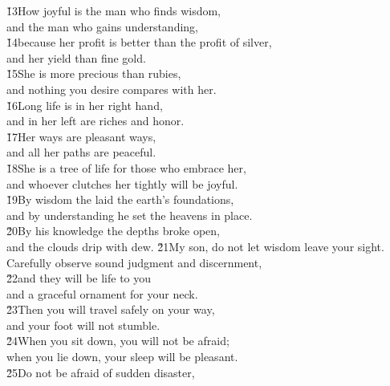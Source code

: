 \begin{poetry}
\poeml \v{13}How joyful is the man who finds wisdom, \\
\poemll    and the man who gains understanding, \\
\poeml \v{14}because her profit is better than the profit of silver, \\
\poemll    and her yield than fine gold. \\
\poeml \v{15}She is more precious than rubies, \\
\poemll    and nothing you desire compares with her. \\
\poeml \v{16}Long life is in her right hand, \\
\poemll    and in her left are riches and honor. \\
\poeml \v{17}Her ways are pleasant ways, \\
\poemll    and all her paths are peaceful. \\
\poeml \v{18}She is a tree of life for those who embrace her, \\
\poemll    and whoever clutches her tightly will be joyful. \\
\poeml \v{19}By wisdom the  laid the earth's foundations, \\
\poemll    and by understanding he set the heavens in place. \\
\poeml \v{20}By his knowledge the depths broke open, \\
\poemll    and the clouds drip with dew.
\poeml \v{21}My son, do not let wisdom leave your sight. \\
\poemll    Carefully observe sound judgment and discernment, \\
\poeml \v{22}and they will be life to you \\
\poemll    and a graceful ornament for your neck. \\
\poeml \v{23}Then you will travel safely on your way, \\
\poemll    and your foot will not stumble. \\
\poeml \v{24}When you sit down, you will not be afraid; \\
\poemll    when you lie down, your sleep will be pleasant. \\
\poeml \v{25}Do not be afraid of sudden disaster, \\

\end{poetry}
